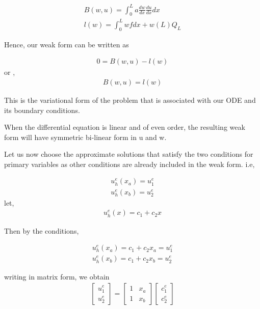 \begin{eqnarray}
	B(w,u) = \int_{0}^{L} a \frac{dw}{dx} \frac{du}{dx} dx \\
	l(w) = \int_{0}^{L} wf dx + w(L) Q_L
\end{eqnarray}

Hence, our weak form can be written as

\begin{eqnarray}
	0 = B(w,u) - l(w)
\end{eqnarray}
or ,
\begin{eqnarray}
	B(w,u) = l(w)
\end{eqnarray}

This is the variational form of the problem that is associated with our ODE and its boundary conditions.

When the differential equation is linear and of even order, the resulting weak form will have symmetric bi-linear form in u and w.
 	


Let us now choose the approximate solutions that satisfy the two conditions for primary variables as other conditions are already included in the weak form. 
i.e,

\begin{eqnarray}
	u_h^{e} (x_a) = u_1^{e} \\
	u_h^{e} (x_b) = u_2^{e}  
\end{eqnarray}
let,
\begin{eqnarray}
	u_h^{e} (x) = c_1 + c_2 x
\end{eqnarray}

Then by the conditions,

\begin{eqnarray}
	u_h^{e} (x_a) = c_1 + c_2 x_a = u_1^{e}\\
	u_h^{e} (x_b) = c_1 + c_2 x_b = u_2^{e}
\end{eqnarray}

writing in matrix form, we obtain
\begin{eqnarray}
\begin{bmatrix}
	u_1^{e}\\
	u_2^{e}
\end{bmatrix}
=
\begin{bmatrix}
	1 & x_a\\
	1 & x_b
\end{bmatrix}
\begin{bmatrix}
	c_1^{e}\\
	c_2^{e}
\end{bmatrix}
\end{eqnarray}

